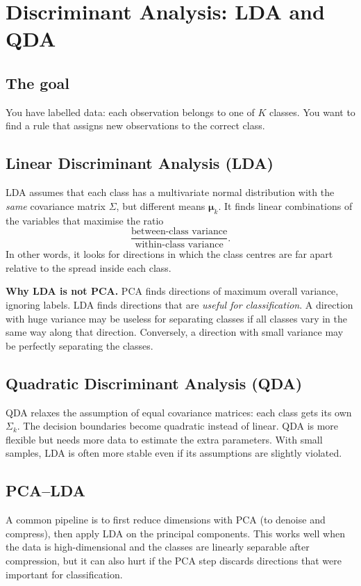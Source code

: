 \documentclass[11pt,a4paper]{article}
\begin{document}
\section{Discriminant Analysis: LDA and QDA}

\subsection{The goal}
You have labelled data: each observation belongs to one of $K$
classes.  You want to find a rule that assigns new observations to
the correct class.

\subsection{Linear Discriminant Analysis (LDA)}
LDA assumes that each class has a multivariate normal distribution
with the \emph{same} covariance matrix $\Sigma$, but different means
$\boldsymbol{\mu}_k$.  It finds linear combinations of the variables
that maximise the ratio
\[
\frac{\text{between-class variance}}{\text{within-class variance}}.
\]
In other words, it looks for directions in which the class centres
are far apart relative to the spread inside each class.

\textbf{Why LDA is not PCA.}  PCA finds directions of maximum overall
variance, ignoring labels.  LDA finds directions that are \emph{useful
for classification}.  A direction with huge variance may be useless
for separating classes if all classes vary in the same way along that
direction.  Conversely, a direction with small variance may be
perfectly separating the classes.

\subsection{Quadratic Discriminant Analysis (QDA)}
QDA relaxes the assumption of equal covariance matrices: each class
gets its own $\Sigma_k$.  The decision boundaries become quadratic
instead of linear.  QDA is more flexible but needs more data to
estimate the extra parameters.  With small samples, LDA is often more
stable even if its assumptions are slightly violated.

\subsection{PCA--LDA}
A common pipeline is to first reduce dimensions with PCA (to denoise
and compress), then apply LDA on the principal components.  This works
well when the data is high-dimensional and the classes are linearly
separable after compression, but it can also hurt if the PCA step
discards directions that were important for classification.
\end{document}
